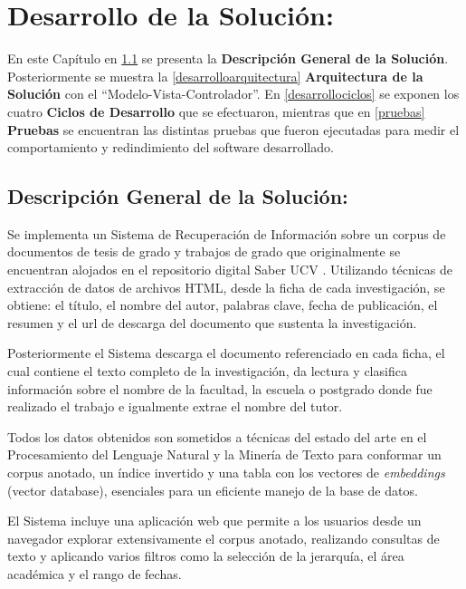 \documentclass[
  12pt,
  openany]{book}
\begin{document}
\hypertarget{desarrollo}{%
\chapter{Desarrollo de la Solución:}\label{desarrollo}}

En este Capítulo en \ref{desarollodescripcion} se presenta la \textbf{Descripción General de la Solución}. Posteriormente se muestra la \ref{desarrolloarquitectura} \textbf{Arquitectura de la Solución} con el ``Modelo-Vista-Controlador''. En \ref{desarrollociclos} se exponen los cuatro \textbf{Ciclos de Desarrollo} que se efectuaron, mientras que en \ref{pruebas} \textbf{Pruebas} se encuentran las distintas pruebas que fueron ejecutadas para medir el comportamiento y redindimiento del software desarrollado.

\hypertarget{desarollodescripcion}{%
\section{Descripción General de la Solución:}\label{desarollodescripcion}}

Se implementa un Sistema de Recuperación de Información sobre un corpus de documentos de tesis de grado y trabajos de grado que originalmente se encuentran alojados en el repositorio digital Saber UCV . Utilizando técnicas de extracción de datos de archivos HTML, desde la ficha de cada investigación, se obtiene: el título, el nombre del autor, palabras clave, fecha de publicación, el resumen y el url de descarga del documento que sustenta la investigación.

Posteriormente el Sistema descarga el documento referenciado en cada ficha, el cual contiene el texto completo de la investigación, da lectura y clasifica información sobre el nombre de la facultad, la escuela o postgrado donde fue realizado el trabajo e igualmente extrae el nombre del tutor.

Todos los datos obtenidos son sometidos a técnicas del estado del arte en el Procesamiento del Lenguaje Natural y la Minería de Texto para conformar un corpus anotado, un índice invertido y una tabla con los vectores de \emph{embeddings} (vector database), esenciales para un eficiente manejo de la base de datos.

El Sistema incluye una aplicación web que permite a los usuarios desde un navegador explorar extensivamente el corpus anotado, realizando consultas de texto y aplicando varios filtros como la selección de la jerarquía, el área académica y el rango de fechas.
\end{document}
